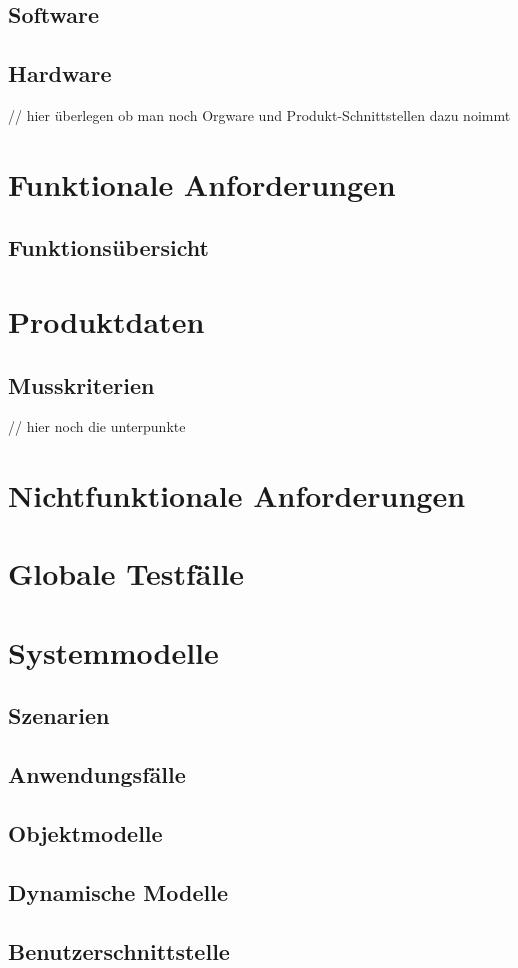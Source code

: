 \documentclass[parskip=full]{scrartcl}
\begin{document}
\subsection{Software}

\subsection{Hardware}
// hier überlegen ob man noch Orgware und Produkt-Schnittstellen dazu noimmt
\section{Funktionale Anforderungen}

\subsection{Funktionsübersicht}

\section{Produktdaten}

\subsection{Musskriterien} // hier noch die unterpunkte

\section{Nichtfunktionale Anforderungen}

\section{Globale Testfälle}

\section{Systemmodelle}

\subsection{Szenarien}

\subsection{Anwendungsfälle}

\subsection{Objektmodelle}

\subsection{Dynamische Modelle}

\subsection{Benutzerschnittstelle}
\end{document}
